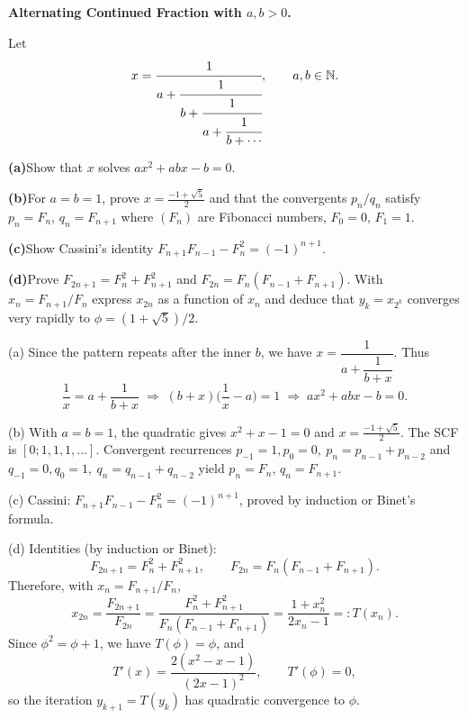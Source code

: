 \begin{problem}[CP-II-0014]
\label{prob:cp-ii-0014}
\textbf{Alternating Continued Fraction with $a,b>0$.}

\hspace*{1.5em}Let
\[
x=\cfrac{1}{\displaystyle a+\cfrac{1}{\displaystyle b+\cfrac{1}{\displaystyle a+\cfrac{1}{\displaystyle b+\cdots}}}},
\qquad a,b\in\mathbb N.
\]

	\par\smallskip\noindent\textbf{(a)}\quad Show that $x$ solves $a x^2 + a b x - b=0$.
	\par\smallskip\noindent\textbf{(b)}\quad For $a=b=1$, prove $x=\frac{-1+\sqrt5}{2}$ and that the convergents $p_n/q_n$ satisfy
	$p_n=F_n$, $q_n=F_{n+1}$ where $(F_n)$ are Fibonacci numbers, $F_0=0$, $F_1=1$.
	\par\smallskip\noindent\textbf{(c)}\quad Show Cassini's identity $F_{n+1}F_{n-1}-F_n^2=(-1)^{n+1}$.
	\par\smallskip\noindent\textbf{(d)}\quad Prove $F_{2n+1}=F_n^2+F_{n+1}^2$ and $F_{2n}=F_n(F_{n-1}+F_{n+1})$.
	With $x_n=F_{n+1}/F_n$ express $x_{2n}$ as a function of $x_n$ and deduce that
	$y_k=x_{2^k}$ converges very rapidly to $\phi=(1+\sqrt5)/2$.

(a) Since the pattern repeats after the inner $b$, we have $x=\dfrac{1}{a+\dfrac{1}{b+x}}$.
Thus
\[
\frac{1}{x}=a+\frac{1}{b+x}\;\Longrightarrow\;
(b+x)\Big(\frac{1}{x}-a\Big)=1
\;\Longrightarrow\; a x^2 + a b x - b=0.
\]

(b) With $a=b=1$, the quadratic gives $x^2+x-1=0$ and $x=\tfrac{-1+\sqrt5}{2}$.
The SCF is $[0;1,1,1,\ldots]$. Convergent recurrences
$p_{-1}=1,p_0=0,\ p_n=p_{n-1}+p_{n-2}$ and
$q_{-1}=0,q_0=1,\ q_n=q_{n-1}+q_{n-2}$ yield $p_n=F_n$, $q_n=F_{n+1}$.

(c) Cassini: $F_{n+1}F_{n-1}-F_n^2=(-1)^{n+1}$, proved by induction or Binet's formula.

(d) Identities (by induction or Binet):
\[
F_{2n+1}=F_n^2+F_{n+1}^2,\qquad F_{2n}=F_n(F_{n-1}+F_{n+1}).
\]
Therefore, with $x_n=F_{n+1}/F_n$,
\[
x_{2n}=\frac{F_{2n+1}}{F_{2n}}
=\frac{F_n^2+F_{n+1}^2}{F_n(F_{n-1}+F_{n+1})}
=\frac{1+x_n^2}{2x_n-1}=:T(x_n).
\]
Since $\phi^2=\phi+1$, we have $T(\phi)=\phi$, and
\[
T'(x)=\frac{2(x^2-x-1)}{(2x-1)^2},\qquad T'(\phi)=0,
\]
so the iteration $y_{k+1}=T(y_k)$ has quadratic convergence to $\phi$.
\end{problem}

